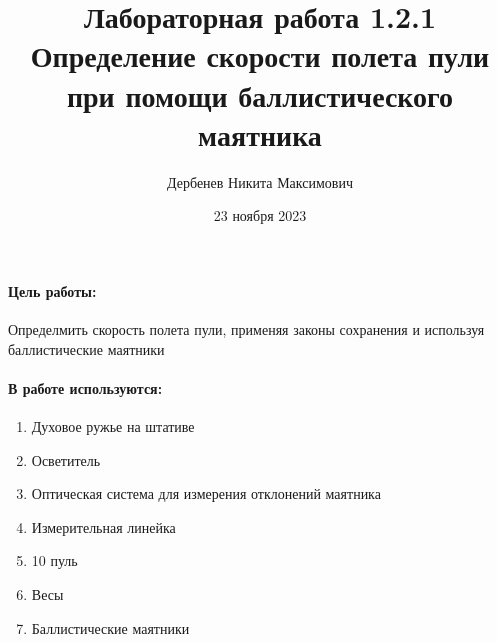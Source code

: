 \documentclass[a4paper, 10pt]{article}%
\author{Дербенев Никита Максимович}
\title{Лабораторная работа 1.2.1\\
	Определение скорости полета пули при помощи баллистического маятника}
\date{23 ноября 2023}
\begin{document}
	\maketitle
	\paragraph {Цель работы:}
		Определмить скорость полета пули, применяя законы сохранения и используя баллистические маятники
	\paragraph{В работе используются:}
	\begin{enumerate}
		\item Духовое ружье на штативе
		\item Осветитель
		\item Оптическая система для измерения отклонений маятника
		\item Измерительная линейка
		\item 10 пуль
		\item Весы
		\item Баллистические маятники
	\end{enumerate}
\end{document}
